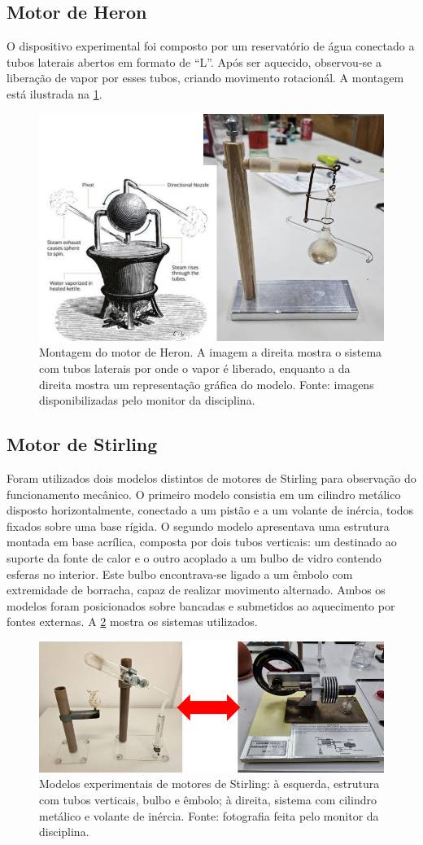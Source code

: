 \subsection{Motor de Heron}
O dispositivo experimental foi composto por um reservatório de água conectado a tubos laterais abertos em formato de ``L''. Após ser aquecido, observou-se a liberação de vapor por esses tubos, criando movimento rotacionál. A montagem está ilustrada na \cref{fig:eron}.

\begin{figure}[H]
\centering
\includegraphics[width=0.42\linewidth]{fig/eron.png}
\caption{Montagem do motor de Heron. A imagem a direita mostra o sistema com tubos laterais por onde o vapor é liberado, enquanto a da direita mostra um representação gráfica do modelo. Fonte: imagens disponibilizadas pelo monitor da disciplina.}
\label{fig:eron}
\end{figure}

\subsection{Motor de Stirling}
Foram utilizados dois modelos distintos de motores de Stirling para observação do funcionamento mecânico. O primeiro modelo consistia em um cilindro metálico disposto horizontalmente, conectado a um pistão e a um volante de inércia, todos fixados sobre uma base rígida. O segundo modelo apresentava uma estrutura montada em base acrílica, composta por dois tubos verticais: um destinado ao suporte da fonte de calor e o outro acoplado a um bulbo de vidro contendo esferas no interior. Este bulbo encontrava-se ligado a um êmbolo com extremidade de borracha, capaz de realizar movimento alternado. Ambos os modelos foram posicionados sobre bancadas e submetidos ao aquecimento por fontes externas. A \cref{fig:stirling} mostra os sistemas utilizados.

\begin{figure}[H]
\centering
\includegraphics[width=0.55\linewidth]{fig/stirling.png}
\caption{Modelos experimentais de motores de Stirling: à esquerda, estrutura com tubos verticais, bulbo e êmbolo; à direita, sistema com cilindro metálico e volante de inércia. Fonte: fotografia feita pelo monitor da disciplina.}
\label{fig:stirling}
\end{figure}

